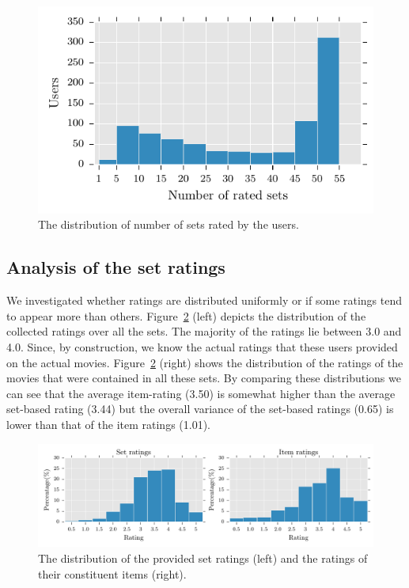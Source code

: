 \begin{figure}[bt]
  \centerline{\includegraphics[scale=0.9]{figures/usersetdist.pdf}}
  \caption{The distribution of number of sets rated by the users.}
  \label{fig:usersetdist}
\end{figure}


\subsection{Analysis of the set ratings}\label{data_analysis}

We investigated whether ratings are distributed uniformly or if some ratings
tend to appear more than others.
Figure~\ref{fig:itemsetratingdist} (left) depicts
the distribution of the collected ratings over all the sets. 
The majority of the ratings lie between 3.0 and 4.0. 
Since, by construction, we know the actual ratings that these users provided on
the actual movies. Figure~\ref{fig:itemsetratingdist} (right) shows the
distribution of the ratings of the movies that were contained in all these sets.
By comparing these distributions we can see that the average item-rating (3.50) is
somewhat higher than the average set-based rating (3.44) but the overall variance of
the set-based ratings (0.65) is lower than that of the item ratings (1.01).

\begin{figure}[t]
  \centerline{\includegraphics[scale=0.82]{figures/itemsetrating_horiz.pdf}}
  \caption{The distribution of the provided set ratings (left) and the ratings of
  their constituent items (right).}
  \label{fig:itemsetratingdist}
\end{figure}


